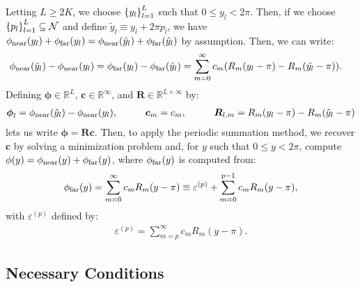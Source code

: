 Letting $L \geq 2K$, we choose $\left\{y_l\right\}_{l=1}^L$ such that
$0 \leq y_l < 2\pi$. Then, if we choose
$\left\{p_l\right\}_{l=1}^L \subseteq \mathcal{N}$ and define
$\tilde{y}_l \equiv y_l + 2\pi p_l$, we have
$\phi_{\operatorname{near}}(y_l) + \phi_{\operatorname{far}}(y_l) = \phi_{\operatorname{near}}(\tilde{y}_l) +
\phi_{\operatorname{far}}(\tilde{y}_l)$ by assumption. Then, we can write:
\begin{align*}
  \phi_{\operatorname{near}}(\tilde{y}_l) - \phi_{\operatorname{near}}(y_l) &= \phi_{\operatorname{far}}(y_l) - \phi_{\operatorname{far}}(\tilde{y}_l) = \sum_{m=0}^\infty c_m (R_m(y_l - \pi) - R_m(\tilde{y_l} - \pi)).
\end{align*}
Defining $\boldsymbol{\phi} \in \mathbb{R}^{L}$, $\boldsymbol{c} \in \mathbb{R}^\infty$, and $\boldsymbol{R} \in \mathbb{R}^{L \times \infty}$
by:
\begin{align*}
  \boldsymbol{\phi}_l = \phi_{\operatorname{near}}(\tilde{y}_l) - \phi_{\operatorname{near}}(y_l), \hspace{1cm} \boldsymbol{c}_m = c_m, \hspace{1cm} \boldsymbol{R}_{l,m} = R_m(y_l - \pi) - R_m(\tilde{y}_l - \pi)
\end{align*}
lets us write $\boldsymbol{\phi} = \boldsymbol{R}
\boldsymbol{c}$. Then, to apply the periodic summation method, we
recover $\boldsymbol{c}$ by solving a minimization problem and, for
$y$ such that $0 \leq y < 2\pi$, compute
$\phi(y) = \phi_{\operatorname{near}}(y) + \phi_{\operatorname{far}}(y)$, where $\phi_{\operatorname{far}}(y)$ is computed
from:
\begin{align*}
  \phi_{\operatorname{far}}(y) = \sum_{m=0}^\infty c_m R_m(y - \pi) \equiv \varepsilon^{(p)} + \sum_{m=0}^{p-1} c_m R_m(y - \pi),
\end{align*}
with $\varepsilon^{(p)}$ defined by:
\begin{align*}
  \varepsilon^{(p)} = \sum_{m=p}^{\infty} c_mR_m(y - \pi).
\end{align*}

\subsection{Necessary Conditions}

